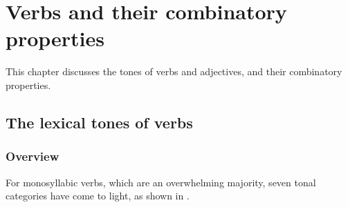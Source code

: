 \chapter{Verbs and their combinatory properties}
\label{chap:verbsandtheircombinatoryproperties}

This chapter discusses the tones of verbs and adjectives, and their combinatory properties.

\section{The lexical tones of verbs}
\label{sec:thelexicaltonesofverbs}

\subsection{Overview}
\label{sec:overview}

For monosyllabic verbs, which are an overwhelming majority, seven tonal categories have come to light, as shown in
. 


